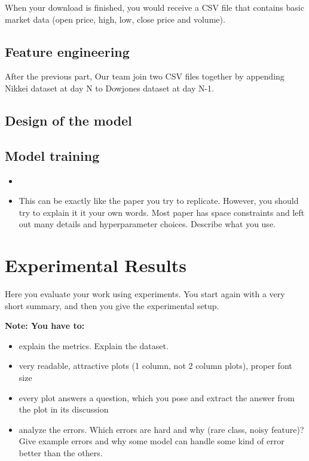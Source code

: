 \documentclass{article}
\begin{document}
When your download is finished, you would receive a CSV file that contains basic market data (open price, high, low, close price and volume).


\subsection{Feature engineering}
After the previous part, Our team join two CSV files together by appending Nikkei dataset at day N to Dowjones dataset at day N-1.

\subsection{Design of the model}


\subsection{Model training}

\begin{itemize}
\item 
\item This can be exactly like the paper you try to replicate. However, you should try to explain it it your own words. Most paper has space constraints and left out many details and hyperparameter choices. Describe what you use.
\end{itemize}


\section{Experimental Results}
\label{sec:exp}

Here you evaluate your work using experiments.  You start again with a very short summary, and then you
give the experimental setup. 

{\bf Note: You have to:}
\begin{itemize}
\item explain the metrics. Explain the dataset.
\item very readable, attractive plots (1 column, not 2 column plots),
proper font size
\item every plot answers a question, which you pose and extract the
answer from the plot in its discussion
\item analyze the errors. Which errors are hard and why (rare class, noisy feature)? Give example errors and why some model can handle some kind of error better than the others.
\end{itemize}
\end{document}

